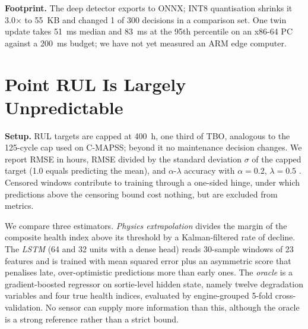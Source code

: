 \noindent\textbf{Footprint.} The deep detector exports to ONNX; INT8 quantisation \citep{jacob2018quant} shrinks it 3.0$\times$ to 55~KB and changed 1 of 300 decisions in a comparison set. One twin update takes 51~ms median and 83~ms at the 95th percentile on an x86-64 PC against a 200~ms budget; we have not yet measured an ARM edge computer.

\section{Point RUL Is Largely Unpredictable}
\label{sec:rul}

\noindent\textbf{Setup.} RUL targets are capped at 400~h, one third of TBO, analogous to the 125-cycle cap used on C-MAPSS; beyond it no maintenance decision changes. We report RMSE in hours, RMSE divided by the standard deviation $\sigma$ of the capped target (1.0 equals predicting the mean), and $\alpha$-$\lambda$ accuracy with $\alpha=0.2$, $\lambda=0.5$ \citep{saxena2010metrics}. Censored windows contribute to training through a one-sided hinge, under which predictions above the censoring bound cost nothing, but are excluded from metrics.

We compare three estimators. \emph{Physics extrapolation} divides the margin of the composite health index above its threshold by a Kalman-filtered rate of decline. The \emph{LSTM} (64 and 32 units with a dense head) reads 30-sample windows of 23 features and is trained with mean squared error plus an asymmetric score that penalises late, over-optimistic predictions more than early ones. The \emph{oracle} is a gradient-boosted regressor on sortie-level hidden state, namely twelve degradation variables and four true health indices, evaluated by engine-grouped 5-fold cross-validation. No sensor can supply more information than this, although the oracle is a strong reference rather than a strict bound.

